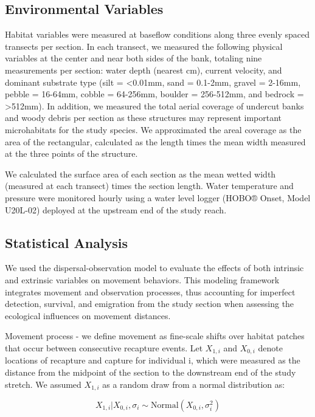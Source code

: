 \documentclass[11pt, class=article, crop=false]{standalone}
\begin{document}
\subsection{Environmental Variables}

Habitat variables were measured at baseflow conditions along three evenly spaced transects per section. In each transect, we measured the following physical variables at the center and near both sides of the bank, totaling nine measurements per section: water depth (nearest cm), current velocity, and dominant substrate type (silt = <0.01mm, sand = 0.1-2mm, gravel = 2-16mm, pebble = 16-64mm, cobble = 64-256mm, boulder = 256-512mm, and bedrock = >512mm). In addition, we measured the total aerial coverage of undercut banks and woody debris per section as these structures may represent important microhabitats for the study species. We approximated the areal coverage as the area of the rectangular, calculated as the length times the mean width measured at the three points of the structure.

We calculated the surface area of each section as the mean wetted width (measured at each transect) times the section length. Water temperature and pressure were monitored hourly using a water level logger (HOBO® Onset, Model U20L-02) deployed at the upstream end of the study reach.

\subsection{Statistical Analysis}

We used the dispersal-observation model to evaluate the effects of both intrinsic and extrinsic variables on movement behaviors. This modeling framework integrates movement and observation processes, thus accounting for imperfect detection, survival, and emigration from the study section when assessing the ecological influences on movement distances.

Movement process - we define movement as fine-scale shifts over habitat patches that occur between consecutive recapture events. Let $X_{1,i}$ and $X_{0,i}$ denote locations of recapture and capture for individual i, which were measured as the distance from the midpoint of the section to the downstream end of the study stretch. We assumed $X_{1,i}$ as a random draw from a normal distribution as:    

\begin{equation}
    X_{1, i}|X_{0, i}, \sigma_i \sim \text{Normal}(X_{0, i}, \sigma_i^2)
    \label{eq:normal}
\end{equation}
\end{document}
